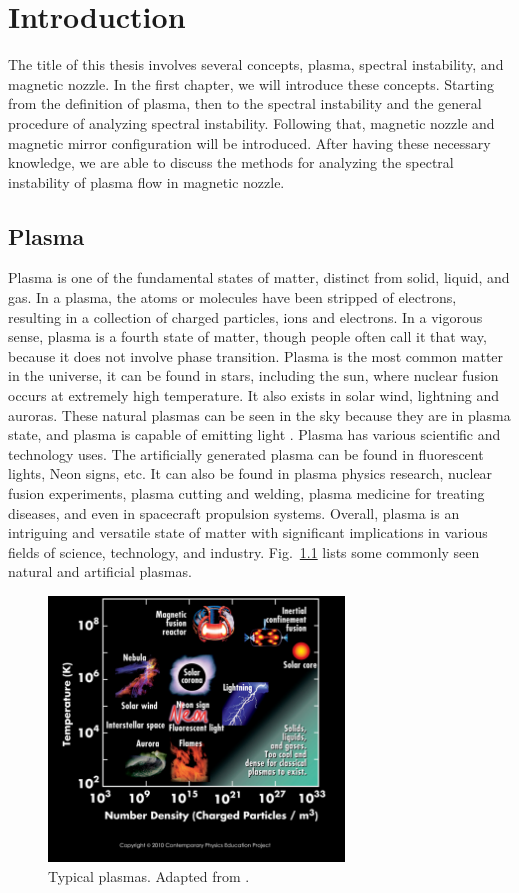 \chapter{Introduction}
The title of this thesis involves several concepts, plasma, spectral instability, and magnetic nozzle. In the first chapter, we will introduce these concepts. Starting from the definition of plasma, then to the spectral instability and the general procedure of analyzing spectral instability. Following that, magnetic nozzle and magnetic mirror configuration will be introduced. After having these necessary knowledge, we are able to discuss the methods for analyzing the spectral instability of plasma flow in magnetic nozzle.

\section{Plasma}
Plasma is one of the fundamental states of matter, distinct from solid, liquid, and gas. In a plasma, the atoms or molecules have been stripped of electrons, resulting in a collection of charged particles, ions and electrons. In a vigorous sense, plasma is a fourth state of matter, though people often call it that way, because it does not involve phase transition. Plasma is the most common matter in the universe, it can be found in stars, including the sun, where nuclear fusion occurs at extremely high temperature. It also exists in solar wind, lightning and auroras. These natural plasmas can be seen in the sky because they are in plasma state, and plasma is capable of emitting light \cite{chen_introduction_2016}. Plasma has various scientific and technology uses. The artificially generated plasma can be found in fluorescent lights, Neon signs, etc. It can also be found in plasma physics research, nuclear fusion experiments, plasma cutting and welding, plasma medicine for treating diseases, and even in spacecraft propulsion systems. Overall, plasma is an intriguing and versatile state of matter with significant implications in various fields of science, technology, and industry. Fig.~\ref{fig:plasma-properties} lists some commonly seen natural and artificial plasmas.

\begin{figure}[htbp]
	\centering
	\includegraphics[width=0.7\textwidth]{figures/plasma-properties}
	\caption{Typical plasmas. Adapted from \cite{cpep_physics}.}
	\label{fig:plasma-properties}
\end{figure}

